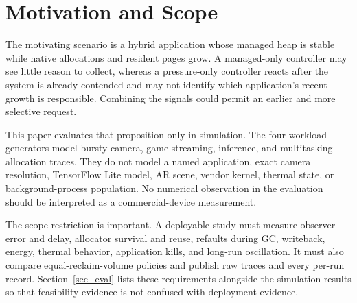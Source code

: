\section{Motivation and Scope}
\label{sec_motivation}
The motivating scenario is a hybrid application whose managed heap is stable while
native allocations and resident pages grow.  A managed-only controller may see
little reason to collect, whereas a pressure-only controller reacts after the
system is already contended and may not identify which application's recent growth
is responsible.  Combining the signals could permit an earlier and more selective
request.

This paper evaluates that proposition only in simulation.  The four workload
generators model bursty camera, game-streaming, inference, and multitasking
allocation traces.  They do not model a named application, exact camera resolution,
TensorFlow Lite model, AR scene, vendor kernel, thermal state, or background-process
population.  No numerical observation in the evaluation should be interpreted as a
commercial-device measurement.

The scope restriction is important.  A deployable study must measure observer
error and delay, allocator survival and reuse, refaults during GC, writeback, energy,
thermal behavior, application kills, and long-run oscillation.  It must also
compare equal-reclaim-volume policies and publish raw traces and every per-run
record.  Section~\ref{sec_eval} lists these requirements alongside the simulation
results so that feasibility evidence is not confused with deployment evidence.
